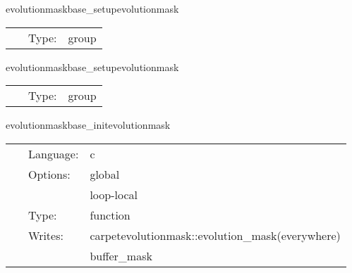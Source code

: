 \hspace{5mm} evolutionmaskbase\_setupevolutionmask 

\hspace{5mm}{\it set up the mask function } 


\hspace{5mm}

 \begin{tabular*}{160mm}{cll} 
~ & Type:  & group \\ 
\end{tabular*} 


\vspace{5mm}


\hspace{5mm} evolutionmaskbase\_setupevolutionmask 

\hspace{5mm}{\it set up the mask function } 


\hspace{5mm}

 \begin{tabular*}{160mm}{cll} 
~ & Type:  & group \\ 
\end{tabular*} 


\vspace{5mm}


\hspace{5mm} evolutionmaskbase\_initevolutionmask 

\hspace{5mm}{\it initialise the mask function } 


\hspace{5mm}

 \begin{tabular*}{160mm}{cll} 
~ & Language:  & c \\ 
~ & Options:  & global \\ 
~& ~ &loop-local\\ 
~ & Type:  & function \\ 
~ & Writes:  & carpetevolutionmask::evolution\_mask(everywhere) \\ 
~& ~ &buffer\_mask\\ 
\end{tabular*} 


\vspace{5mm}


